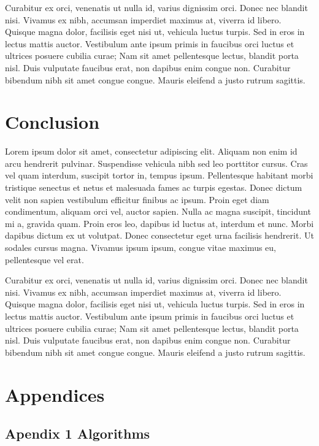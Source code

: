 \documentclass[
  openany]{book}
\begin{document}
Curabitur ex orci, venenatis ut nulla id, varius dignissim orci. Donec nec blandit nisi. Vivamus ex nibh, accumsan imperdiet maximus at, viverra id libero. Quisque magna dolor, facilisis eget nisi ut, vehicula luctus turpis. Sed in eros in lectus mattis auctor. Vestibulum ante ipsum primis in faucibus orci luctus et ultrices posuere cubilia curae; Nam sit amet pellentesque lectus, blandit porta nisl. Duis vulputate faucibus erat, non dapibus enim congue non. Curabitur bibendum nibh sit amet congue congue. Mauris eleifend a justo rutrum sagittis.

\hypertarget{conclusion}{%
\chapter{Conclusion}\label{conclusion}}

Lorem ipsum dolor sit amet, consectetur adipiscing elit. Aliquam non enim id arcu hendrerit pulvinar. Suspendisse vehicula nibh sed leo porttitor cursus. Cras vel quam interdum, suscipit tortor in, tempus ipsum. Pellentesque habitant morbi tristique senectus et netus et malesuada fames ac turpis egestas. Donec dictum velit non sapien vestibulum efficitur finibus ac ipsum. Proin eget diam condimentum, aliquam orci vel, auctor sapien. Nulla ac magna suscipit, tincidunt mi a, gravida quam. Proin eros leo, dapibus id luctus at, interdum et nunc. Morbi dapibus dictum ex ut volutpat. Donec consectetur eget urna facilisis hendrerit. Ut sodales cursus magna. Vivamus ipsum ipsum, congue vitae maximus eu, pellentesque vel erat.

Curabitur ex orci, venenatis ut nulla id, varius dignissim orci. Donec nec blandit nisi. Vivamus ex nibh, accumsan imperdiet maximus at, viverra id libero. Quisque magna dolor, facilisis eget nisi ut, vehicula luctus turpis. Sed in eros in lectus mattis auctor. Vestibulum ante ipsum primis in faucibus orci luctus et ultrices posuere cubilia curae; Nam sit amet pellentesque lectus, blandit porta nisl. Duis vulputate faucibus erat, non dapibus enim congue non. Curabitur bibendum nibh sit amet congue congue. Mauris eleifend a justo rutrum sagittis.

\hypertarget{appendices}{%
\chapter*{Appendices}\label{appendices}}

\hypertarget{apendix-1-algorithms}{%
\section{Apendix 1 Algorithms}\label{apendix-1-algorithms}}
\end{document}
